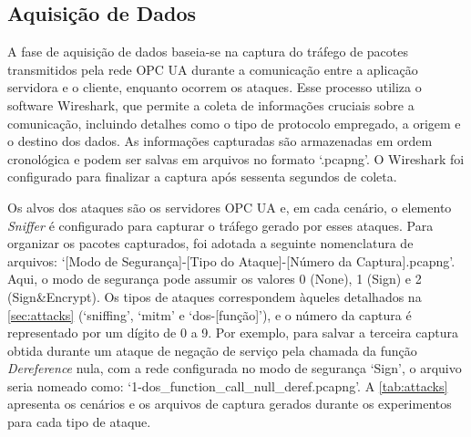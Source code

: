     \subsection{Aquisição de Dados} \label{sec:aquisicao}

        A fase de aquisição de dados baseia-se na captura do tráfego de pacotes transmitidos pela rede OPC UA durante a comunicação entre a aplicação servidora e o cliente, enquanto ocorrem os ataques. Esse processo utiliza o software Wireshark, que permite a coleta de informações cruciais sobre a comunicação, incluindo detalhes como o tipo de protocolo empregado, a origem e o destino dos dados. As informações capturadas são armazenadas em ordem cronológica e podem ser salvas em arquivos no formato `.pcapng'. O Wireshark foi configurado para finalizar a captura após sessenta segundos de coleta.

        Os alvos dos ataques são os servidores OPC UA e, em cada cenário, o elemento \textit{Sniffer} é configurado para capturar o tráfego gerado por esses ataques. Para organizar os pacotes capturados, foi adotada a seguinte nomenclatura de arquivos: `[Modo de Segurança]-[Tipo do Ataque]-[Número da Captura].pcapng'. Aqui, o modo de segurança pode assumir os valores 0 (None), 1 (Sign) e 2 (Sign\&Encrypt). Os tipos de ataques correspondem àqueles detalhados na \autoref{sec:attacks} (`sniffing', `mitm' e `dos-[função]'), e o número da captura é representado por um dígito de 0 a 9. Por exemplo, para salvar a terceira captura obtida durante um ataque de negação de serviço pela chamada da função \textit{Dereference} nula, com a rede configurada no modo de segurança `Sign', o arquivo seria nomeado como: `1-dos\_function\_call\_null\_deref.pcapng'. A \autoref{tab:attacks} apresenta os cenários e os arquivos de captura gerados durante os experimentos para cada tipo de ataque.

